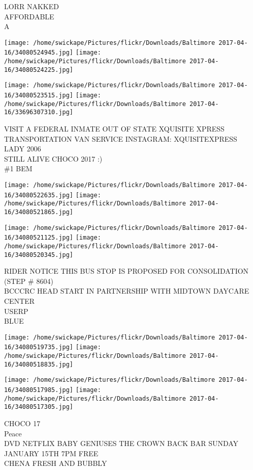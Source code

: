 \documentclass[10pt,letterpaper]{article}
\begin{document}
LORR NAKKED\\
AFFORDABLE\\
A\\
\pagebreak

\texttt{[image: /home/swickape/Pictures/flickr/Downloads/Baltimore 2017-04-16/34080524945.jpg]}
\texttt{[image: /home/swickape/Pictures/flickr/Downloads/Baltimore 2017-04-16/34080524225.jpg]}

\texttt{[image: /home/swickape/Pictures/flickr/Downloads/Baltimore 2017-04-16/34080523515.jpg]}
\texttt{[image: /home/swickape/Pictures/flickr/Downloads/Baltimore 2017-04-16/33696307310.jpg]}

VISIT A FEDERAL INMATE OUT OF STATE XQUISITE XPRESS TRANSPORTATION VAN SERVICE  INSTAGRAM: XQUISITEXPRESS\\
LADY 2006\\
STILL ALIVE CHOCO 2017 :)\\
\#1 BEM\\
\pagebreak

\texttt{[image: /home/swickape/Pictures/flickr/Downloads/Baltimore 2017-04-16/34080522635.jpg]}
\texttt{[image: /home/swickape/Pictures/flickr/Downloads/Baltimore 2017-04-16/34080521865.jpg]}

\texttt{[image: /home/swickape/Pictures/flickr/Downloads/Baltimore 2017-04-16/34080521125.jpg]}
\texttt{[image: /home/swickape/Pictures/flickr/Downloads/Baltimore 2017-04-16/34080520345.jpg]}

RIDER NOTICE THIS BUS STOP IS PROPOSED FOR CONSOLIDATION (STEP \# 8604)\\
BCCCRC HEAD START IN PARTNERSHIP WITH MIDTOWN DAYCARE CENTER\\
USERP\\
BLUE\\
\pagebreak

\texttt{[image: /home/swickape/Pictures/flickr/Downloads/Baltimore 2017-04-16/34080519735.jpg]}
\texttt{[image: /home/swickape/Pictures/flickr/Downloads/Baltimore 2017-04-16/34080518835.jpg]}

\texttt{[image: /home/swickape/Pictures/flickr/Downloads/Baltimore 2017-04-16/34080517985.jpg]}
\texttt{[image: /home/swickape/Pictures/flickr/Downloads/Baltimore 2017-04-16/34080517305.jpg]}

CHOCO 17\\
Peace\\
DVD NETFLIX BABY GENIUSES THE CROWN BACK BAR SUNDAY JANUARY 15TH 7PM FREE\\
CHENA FRESH AND BUBBLY\\
\pagebreak
\end{document}
